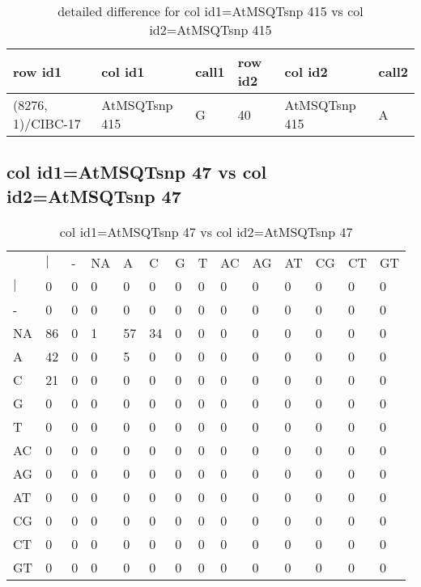 \begin{center}
\begin{longtable}{|l|l|l|l|l|l|}
\caption{detailed difference for col id1=AtMSQTsnp 415 vs col id2=AtMSQTsnp 415} \label{table_dm741}\\
\hline
row id1&col id1&call1&row id2&col id2&call2\\
\hline
(8276, 1)/CIBC-17&AtMSQTsnp 415&G&40&AtMSQTsnp 415&A\\
\hline
\end{longtable}
\end{center}

\subsection{col id1=AtMSQTsnp 47 vs col id2=AtMSQTsnp 47}
\begin{center}
\begin{longtable}{|l|l|l|l|l|l|l|l|l|l|l|l|l|l|}
\caption{col id1=AtMSQTsnp 47 vs col id2=AtMSQTsnp 47} \label{table_dm742}\\
\hline
\\
\hline
&$|$&-&NA&A&C&G&T&AC&AG&AT&CG&CT&GT\\
$|$&0&0&0&0&0&0&0&0&0&0&0&0&0\\
-&0&0&0&0&0&0&0&0&0&0&0&0&0\\
NA&86&0&1&57&34&0&0&0&0&0&0&0&0\\
A&42&0&0&5&0&0&0&0&0&0&0&0&0\\
C&21&0&0&0&0&0&0&0&0&0&0&0&0\\
G&0&0&0&0&0&0&0&0&0&0&0&0&0\\
T&0&0&0&0&0&0&0&0&0&0&0&0&0\\
AC&0&0&0&0&0&0&0&0&0&0&0&0&0\\
AG&0&0&0&0&0&0&0&0&0&0&0&0&0\\
AT&0&0&0&0&0&0&0&0&0&0&0&0&0\\
CG&0&0&0&0&0&0&0&0&0&0&0&0&0\\
CT&0&0&0&0&0&0&0&0&0&0&0&0&0\\
GT&0&0&0&0&0&0&0&0&0&0&0&0&0\\
\hline
\end{longtable}
\end{center}

